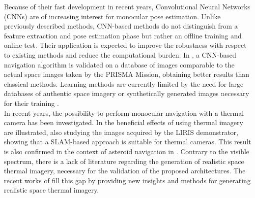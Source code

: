 Because of their fast development in recent years, Convolutional Neural Networks (CNNs) are of increasing interest for monocular pose estimation. Unlike previously described methods, CNN-based methods do not distinguish from a feature extraction and pose estimation phase but rather an offline training and online test. Their application is expected to improve the robustness with respect to existing methods and reduce the computational burden. In  \cite{sharma2018pose}, a CNN-based navigation algorithm is validated on a database of images comparable to the actual space images taken by the PRISMA Mission, obtaining better results than classical methods. Learning methods are currently limited by the need for large databases of authentic space imagery or synthetically generated images necessary for their training \cite{cassinis2019review}.\\
In recent years, the possibility to perform monocular navigation with a thermal camera has been investigated. In \cite{Yilmaz2017UsingIB} the beneficial effects of using thermal imagery are illustrated, also studying the images acquired by the LIRIS demonstrator, showing that a SLAM-based approach is suitable for thermal cameras. This result is also confirmed in the context of asteroid navigation in \cite{civardi2021small,piccinin2023spacecraft,piccinin2021multispectral}. Contrary to the visible spectrum, there is a lack of literature regarding the generation of realistic space thermal imagery, necessary for the validation of the proposed architectures. The recent works of \cite{CIVARDI2023,yilmaz2019thermal}  fill this gap by providing new insights and methods for generating realistic space thermal imagery.

